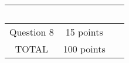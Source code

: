 {{{\begin{center}
\begin{tabular}{|c|c|l|}
	& \hspace{.5in} \mbox{ }  \\ \hline 
\hspace{.05in} Question 8 \hspace{.05in}&\hspace{.05in}15 points\hspace{.05in} 
	& \hspace{.5in} \mbox{ }  \\ \hline 
\hline
\hspace{.05in} TOTAL \hspace{.05in}&\hspace{.05in}100 points\hspace{.05in} 
	& \hspace{.5in} \mbox{ }  \\ \hline \hline
\end{tabular}
\end{center}
}

\newpage



\begin{enumerate}


\end{enumerate}}}
